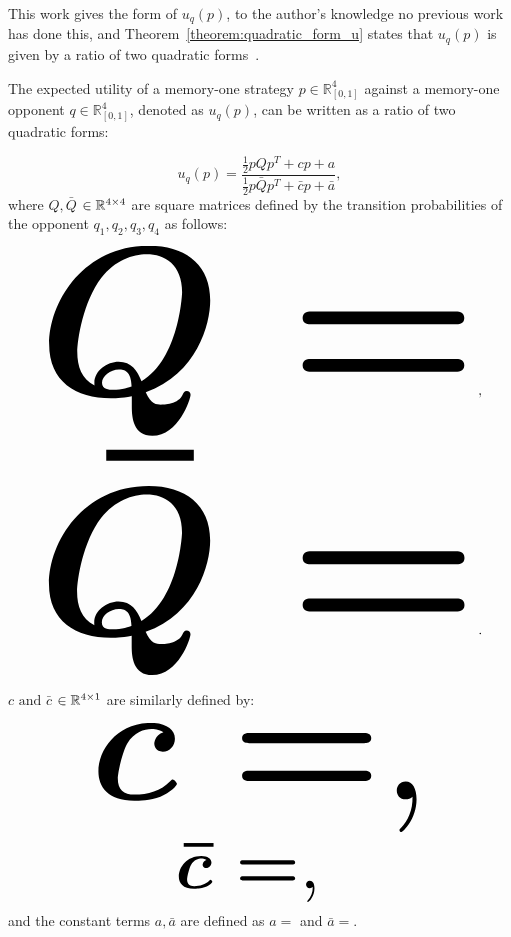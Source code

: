 This work gives the form of \(u_q(p)\), to the author's knowledge no
previous work has done this, and Theorem~\ref{theorem:quadratic_form_u} states that \(u_q(p)\)
is given by a ratio of two quadratic forms~\cite{kepner2011}.

\begin{theorem}\label{theorem:quadratic_form_u}
    The expected utility of a memory-one strategy \(p\in\mathbb{R}_{[0,1]}^4\)
    against a memory-one opponent \(q\in\mathbb{R}_{[0,1]}^4\), denoted
    as \(u_q(p)\), can be written as a ratio of two quadratic forms:

    \begin{equation}\label{eq:optimisation_quadratic}
    u_q(p) = \frac{\frac{1}{2}pQp^T + cp + a}
                {\frac{1}{2}p\bar{Q}p^T + \bar{c}p + \bar{a}},
    \end{equation}
    where \(Q, \bar{Q}\) \(\in \mathbb{R}^{4\times4}\) are square matrices defined by the
    transition probabilities of the opponent \(q_1, q_2, q_3, q_4\) as follows:

    \begin{center}
    \begin{equation}
    \resizebox{0.91\linewidth}{!}{\arraycolsep=2.5pt%
    \boldmath\(
    Q = \)},
    \end{equation}
    \begin{equation}\label{eq:q_bar_matrix}
    \resizebox{0.91\linewidth}{!}{\arraycolsep=2.5pt%
    \boldmath\(
    \bar{Q} =  \)}.
    \end{equation}
    \end{center}

    \(c \text{ and } \bar{c}\) \(\in \mathbb{R}^{4 \times 1}\) are similarly defined by:

    \begin{equation}\label{eq:q_matrix_numerator}
    \resizebox{0.70\linewidth}{!}{\arraycolsep=2.5pt%
    \boldmath\(c = \),}
    \end{equation}
    \begin{equation}\label{eq:q_matrix_denominator}
    \resizebox{0.35\linewidth}{!}{\arraycolsep=2.5pt%
    \boldmath\(\bar{c} = \),
    }
    \end{equation}
    and the constant terms \(a, \bar{a}\) are defined as \(a = \) and
    \(\bar{a} = \).
\end{theorem}

